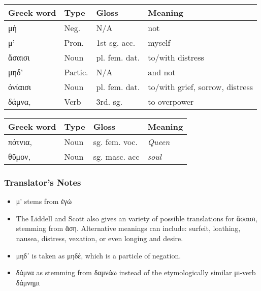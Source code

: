 \begin{table}[H]
\begin{tabular}{@{}llll@{}}
\toprule
\textbf{Greek word} & \textbf{Type} & \textbf{Gloss} & \textbf{Meaning}                \\ \midrule
μή                  & Neg.          & N/A            & not                             \\
μ'                  & Pron.         & 1st sg. acc.   & myself                          \\
ἄσαισι              & Noun          & pl. fem. dat.  & to/with distress                \\
μηδ'                & Partic.       & N/A            & and not                         \\
ὀνίαισι             & Noun          & pl. fem. dat.  & to/with grief, sorrow, distress \\
δάμνα,              & Verb          & 3rd. sg.       & to overpower                    \\ \bottomrule
\end{tabular}
\end{table}

\begin{table}[H]
\begin{tabular}{@{}llll@{}}
\toprule
\textbf{Greek word} & \textbf{Type} & \textbf{Gloss}     & \textbf{Meaning} \\ \midrule
πότνια,             & Noun          & sg. fem. voc. & \textit{Queen}   \\
θῦμον,              & Noun          & sg. masc. acc      & \textit{soul}    \\ \bottomrule
\end{tabular}
\end{table}

\subsubsection*{Translator's Notes}
\begin{itemize}
  \item μ' stems from ἐγώ
  \item The Liddell and Scott also gives an variety of possible translations for ἄσαισι, stemming from ἄση. Alternative meanings can include: surfeit, loathing, nausea, distress, vexation, or even longing and desire.
  \item μηδ᾽ is taken as μηδέ, which is a particle of negation.
  \item δάμνα as stemming from δαμνάω instead of the etymologically similar μι-verb δάμνημι
\end{itemize}

